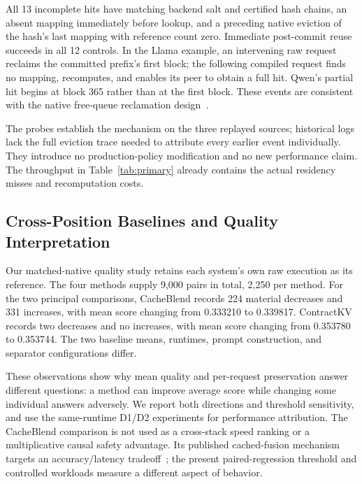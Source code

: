 All 13 incomplete hits have matching backend salt and certified hash chains, an absent mapping immediately before lookup, and a preceding native eviction of the hash's last mapping with reference count zero. Immediate post-commit reuse succeeds in all 12 controls. In the Llama example, an intervening raw request reclaims the committed prefix's first block; the following compiled request finds no mapping, recomputes, and enables its peer to obtain a full hit. Qwen's partial hit begins at block 365 rather than at the first block. These events are consistent with the native free-queue reclamation design~\cite{vllmAPC}.

The probes establish the mechanism on the three replayed sources; historical logs lack the full eviction trace needed to attribute every earlier event individually. They introduce no production-policy modification and no new performance claim. The throughput in Table~\ref{tab:primary} already contains the actual residency misses and recomputation costs.

\subsection{Cross-Position Baselines and Quality Interpretation}
\label{sec:baselines}
Our matched-native quality study retains each system's own raw execution as its reference. The four methods supply 9,000 pairs in total, 2,250 per method. For the two principal comparisons, CacheBlend records 224 material decreases and 331 increases, with mean score changing from 0.333210 to 0.339817. ContractKV records two decreases and no increases, with mean score changing from 0.353780 to 0.353744. The two baseline means, runtimes, prompt construction, and separator configurations differ.

These observations show why mean quality and per-request preservation answer different questions: a method can improve average score while changing some individual answers adversely. We report both directions and threshold sensitivity, and use the same-runtime D1/D2 experiments for performance attribution. The CacheBlend comparison is not used as a cross-stack speed ranking or a multiplicative causal safety advantage. Its published cached-fusion mechanism targets an accuracy/latency tradeoff~\cite{cacheblend2025}; the present paired-regression threshold and controlled workloads measure a different aspect of behavior.

